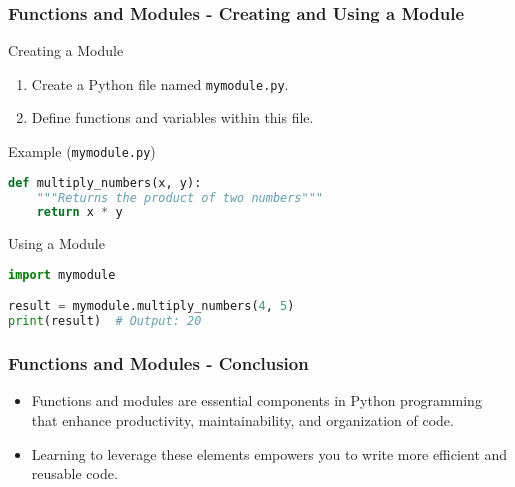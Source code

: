\documentclass{beamer}
\begin{document}
\begin{frame}[fragile]
    \frametitle{Functions and Modules - Creating and Using a Module}
    \begin{block}{Creating a Module}
        \begin{enumerate}
            \item Create a Python file named \texttt{mymodule.py}.
            \item Define functions and variables within this file.
        \end{enumerate}
    \end{block}

    \begin{block}{Example (\texttt{mymodule.py})}
    \begin{lstlisting}[language=Python]
def multiply_numbers(x, y):
    """Returns the product of two numbers"""
    return x * y
    \end{lstlisting}
    \end{block}

    \begin{block}{Using a Module}
    \begin{lstlisting}[language=Python]
import mymodule

result = mymodule.multiply_numbers(4, 5)
print(result)  # Output: 20
    \end{lstlisting}
    \end{block}
\end{frame}

\begin{frame}[fragile]
    \frametitle{Functions and Modules - Conclusion}
    \begin{itemize}
        \item Functions and modules are essential components in Python programming that enhance productivity, maintainability, and organization of code.
        \item Learning to leverage these elements empowers you to write more efficient and reusable code.
    \end{itemize}
\end{frame}
\end{document}
